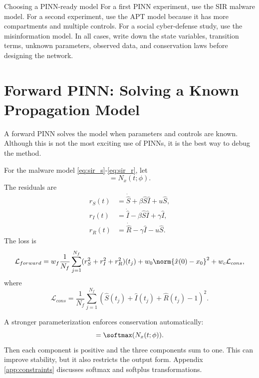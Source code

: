 \documentclass[11pt,a4paper]{article}
\begin{document}
\begin{examplebox}{Choosing a PINN-ready model}
For a first PINN experiment, use the SIR malware model. For a second experiment, use the APT model because it has more compartments and multiple controls. For a social cyber-defense study, use the misinformation model. In all cases, write down the state variables, transition terms, unknown parameters, observed data, and conservation laws before designing the network.
\end{examplebox}

\section{Forward PINN: Solving a Known Propagation Model}

A forward PINN solves the model when parameters and controls are known. Although this is not the most exciting use of PINNs, it is the best way to debug the method.

For the malware model \eqref{eq:sir_s}-\eqref{eq:sir_r}, let
\begin{equation}
    [\hat{S}(t),\hat{I}(t),\hat{R}(t)]=N_x(t;\phi).
\end{equation}
The residuals are
\begin{align}
    r_S(t) &= \dot{\hat{S}} + \beta \hat{S}\hat{I} + u\hat{S},\\
    r_I(t) &= \dot{\hat{I}} - \beta \hat{S}\hat{I} + \gamma \hat{I},\\
    r_R(t) &= \dot{\hat{R}} - \gamma \hat{I} - u\hat{S}.
\end{align}
The loss is
\begin{equation}
    \mathcal{L}_{forward}=w_f\frac{1}{N_f}\sum_{j=1}^{N_f}(r_S^2+r_I^2+r_R^2)(t_j)+w_0\norm{\hat{x}(0)-x_0}^2+w_c\mathcal{L}_{cons},
\end{equation}
where
\begin{equation}
    \mathcal{L}_{cons}=\frac{1}{N_f}\sum_{j=1}^{N_f}\left(\hat{S}(t_j)+\hat{I}(t_j)+\hat{R}(t_j)-1\right)^2.
\end{equation}

A stronger parameterization enforces conservation automatically:
\begin{equation}
    [\hat{S},\hat{I},\hat{R}]=\softmax(N_x(t;\phi)).
\end{equation}
Then each component is positive and the three components sum to one. This can improve stability, but it also restricts the output form. Appendix \ref{app:constraints} discusses softmax and softplus transformations.
\end{document}
